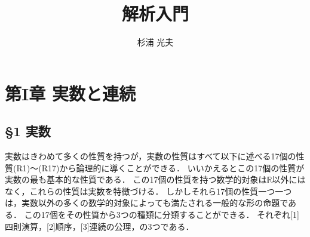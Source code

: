 \documentclass{ltjsarticle}
\theoremstyle{definition}
\theoremstyle{propcorollarystyle}
\theoremstyle{thmcorollarystyle}
\begin{document}
\title{解析入門}
\author{杉浦 光夫}
\maketitle

\section*{第I章 実数と連続}
\subsection*{\S1 実数} 
実数はきわめて多くの性質を持つが，実数の性質はすべて以下に述べる17個の性質(R1)～(R17)から論理的に導くことができる．
いいかえるとこの17個の性質が実数の最も基本的な性質である．
この17個の性質を持つ数学的対象は$\mathbb{R}$以外にはなく，これらの性質は実数を特徴づける．
しかしそれら17個の性質一つ一つは，実数以外の多くの数学的対象によっても満たされる一般的な形の命題である．
この17個をその性質から3つの種類に分類することができる．
それぞれ[1]四則演算，[2]順序，[3]連続の公理，の3つである．
\end{document}
